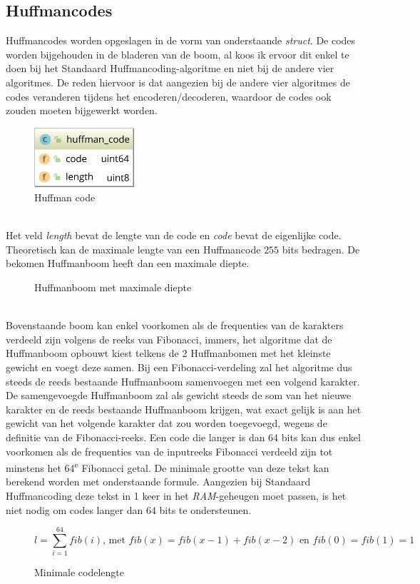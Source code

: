 \subsection{Huffmancodes}
Huffmancodes worden opgeslagen in de vorm van onderstaande \emph{struct}. De codes worden bijgehouden in de bladeren van de boom, al koos ik ervoor dit enkel te doen bij het Standaard Huffmancoding-algoritme en niet bij de andere vier algoritmes. De reden hiervoor is dat aangezien bij de andere vier algoritmes de codes veranderen tijdens het encoderen/decoderen, waardoor de codes ook zouden moeten bijgewerkt worden.
\begin{figure}[h]
	\centering
	\includegraphics[width=10em]{resources/huffman-code.png}
	\caption{Huffman code}
\end{figure}
\\Het veld \emph{length} bevat de lengte van de code en \emph{code} bevat de eigenlijke code. Theoretisch kan de maximale lengte van een Huffmancode $255$ bits bedragen. De bekomen Huffmanboom heeft dan een maximale diepte.
\begin{figure}[h]
	\centering
{}
\caption{Huffmanboom met maximale diepte}
\end{figure}
\\Bovenstaande boom kan enkel voorkomen als de frequenties van de karakters verdeeld zijn volgens de reeks van Fibonacci, immers, het algoritme dat de Huffmanboom opbouwt kiest telkens de 2 Huffmanbomen met het kleinste gewicht en voegt deze samen. Bij een Fibonacci-verdeling zal het algoritme dus steeds de reeds bestaande Huffmanboom samenvoegen met een volgend karakter. De samengevoegde Huffmanboom zal als gewicht steeds de som van het nieuwe karakter en de reeds bestaande Huffmanboom krijgen, wat exact gelijk is aan het gewicht van het volgende karakter dat zou worden toegevoegd, wegens de definitie van de Fibonacci-reeks. Een code die langer is dan 64 bits kan dus enkel voorkomen als de frequenties van de inputreeks Fibonacci verdeeld zijn tot minstens het 64\textsuperscript{e} Fibonacci getal. De minimale grootte van deze tekst kan berekend worden met onderstaande formule. Aangezien bij Standaard Huffmancoding deze tekst in 1 keer in het \emph{RAM}-geheugen moet passen, is het niet nodig om codes langer dan 64 bits te ondersteunen.
\begin{figure}[h]
	$$l = \sum_{i=1}^{64} fib(i)\text{, met }fib(x) = fib(x-1) + fib(x-2)\text{ en }fib(0) = fib(1) = 1$$
	\caption{Minimale codelengte}
\end{figure}